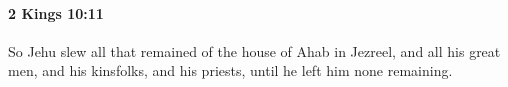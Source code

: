 
		\paragraph{2 Kings 10:11} %
			\label{2KINGS-10-11}

			So Jehu slew all that remained of the house of Ahab in Jezreel, and all his great men, and his kinsfolks, and his priests, until he left him none remaining.


